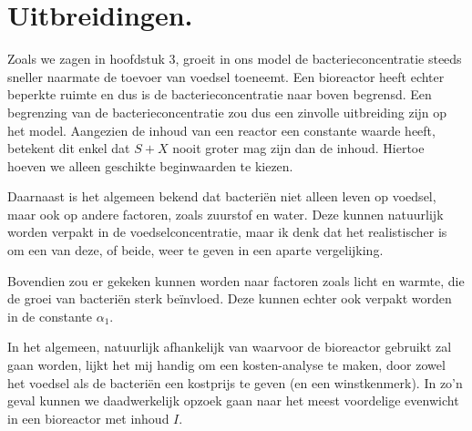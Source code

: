 
\chapter{Uitbreidingen.}
\label{Uitbreidingen}

Zoals we zagen in hoofdstuk 3, groeit in ons model de bacterieconcentratie steeds sneller naarmate de toevoer van voedsel toeneemt. Een bioreactor heeft echter beperkte ruimte en dus is de bacterieconcentratie naar boven begrensd. Een begrenzing van de bacterieconcentratie zou dus een zinvolle uitbreiding zijn op het model. Aangezien de inhoud van een reactor een constante waarde heeft, betekent dit enkel dat $S + X$ nooit groter mag zijn dan de inhoud. Hiertoe hoeven we alleen geschikte beginwaarden te kiezen. 

Daarnaast is het algemeen bekend dat bacteri\"en niet alleen leven op voedsel, maar ook op andere factoren, zoals zuurstof en water. Deze kunnen natuurlijk worden verpakt in de voedselconcentratie, maar ik denk dat het realistischer is om een van deze, of beide, weer te geven in een aparte vergelijking. 

Bovendien zou er gekeken kunnen worden naar factoren zoals licht en warmte, die de groei van bacteri\"en sterk be\"invloed. Deze kunnen echter ook verpakt worden in de constante $\alpha_1$. 

In het algemeen, natuurlijk afhankelijk van waarvoor de bioreactor gebruikt zal gaan worden, lijkt het mij handig om een kosten-analyse te maken, door zowel het voedsel als de bacteri\"en een kostprijs te geven (en een winstkenmerk). In zo'n geval kunnen we daadwerkelijk opzoek gaan naar het meest voordelige evenwicht in een bioreactor met inhoud $I$. 

